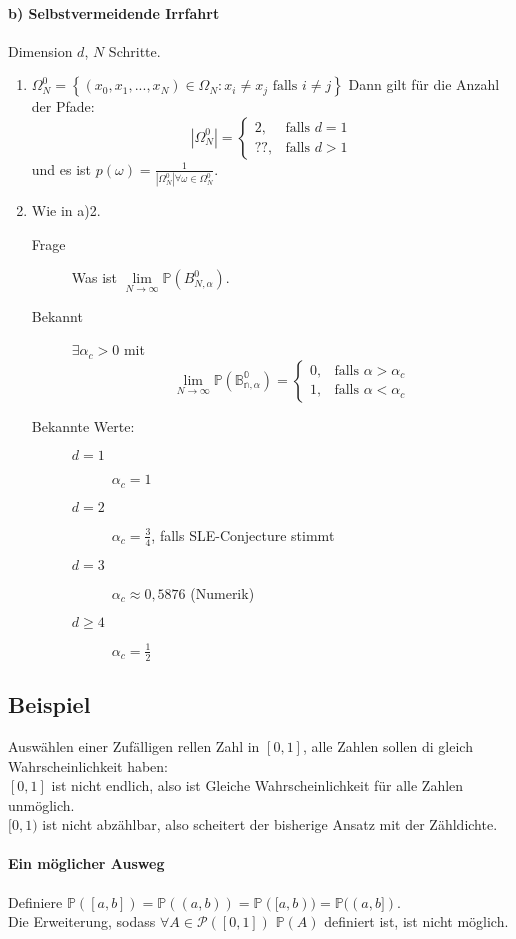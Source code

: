 \documentclass[10pt,a4paper]{article}
\newcommand{\al}{\ensuremath{\alpha}}
\newcommand{\potset}{\mathscr P}
\newcommand{\Prb}{\mathbb P}
\newcounter{thm}[section]
\let\oldsubsection\subsection
\renewcommand{\subsection}{\stepcounter{thm}\oldsubsection}
\theoremstyle{definition}
\theoremstyle{plain}
\theoremstyle{remark}
\begin{document}
	\paragraph*{b) Selbstvermeidende Irrfahrt}Dimension $d$, $N$ Schritte.
	\begin{enumerate}
		\item $\Omega_N^0=\left\{(x_0,x_1,...,x_N)\in\Omega_N:x_i\neq x_j\text{ falls }i\neq j\right\}$
		Dann gilt für die Anzahl der Pfade:
		\[|\Omega_N^0|=\begin{cases}
		2,&\text{falls $d=1$}\\??,&\text{falls $d>1$}
		\end{cases}\]
		und es ist $p(\omega)=\frac{1}{|\Omega_N^0|\forall\omega\in\Omega_N^0}$.
		\item Wie in a)2. 
		\begin{description}
			\item[Frage] Was ist $\lim\limits_{N\to\infty}\Prb(B_{N,\al}^0)$.
			\item[Bekannt] $\exists\al_c>0$ mit \[\lim\limits_{N\to\infty}\mathbb{ P(B_{n,\al}^0)}=\begin{cases}
			0,&\text{falls $\al>\al_c$}\\1,&\text{falls $\al<\al_c$}
			\end{cases}\]
			\item[Bekannte Werte:]
			\begin{description}
				\item[$d=1$] $\al_c=1$
				\item[$d=2$] $\al_c=\frac{3}{4}$, falls SLE-Conjecture stimmt
				\item[$d=3$] $\al_c\approx 0,5876$ (Numerik)
				\item[$d\ge 4$] $\al_c=\frac{1}{2}$
			\end{description}
		\end{description}
	\end{enumerate}
	\subsection{Beispiel}
	Auswählen einer Zufälligen rellen Zahl in $[0,1]$, alle Zahlen sollen di gleich Wahrscheinlichkeit haben:\\
	$[0,1]$ ist nicht endlich, also ist Gleiche Wahrscheinlichkeit für alle Zahlen unmöglich.\\
	$[0,1)$ ist nicht abzählbar, also scheitert der bisherige Ansatz mit der Zähldichte.\\
	\paragraph*{Ein möglicher Ausweg} Definiere $\Prb([a,b])=\Prb((a,b))=\Prb([a,b))=\Prb((a,b])$.\\
	Die Erweiterung, sodass $\forall A\in\potset([0,1])$ $\Prb(A)$ definiert ist, ist nicht möglich.
\end{document}
